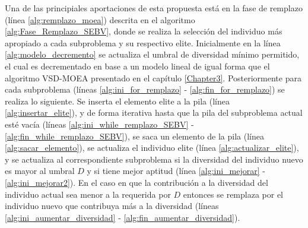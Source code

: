 Una de las principiales aportaciones de esta propuesta está en la fase de remplazo (línea \ref{alg:remplazo_moea}) descrita en el algoritmo \ref{alg:Fase_Remplazo_SEBV}, donde se realiza la selección del individuo más apropiado a cada subproblema y su respectivo elite.
%
Inicialmente en la línea \ref{alg:modelo_decremento} se actualiza el umbral de diversidad mínimo permitido, el cual es decrementado en base a un modelo lineal de igual forma que el algoritmo VSD-MOEA presentado en el capítulo \ref{Chapter3}.
%
Posteriormente para cada subproblema (líneas \ref{alg:ini_for_remplazo} - \ref{alg:fin_for_remplazo}) se realiza lo siguiente.
%
Se inserta el elemento elite a la pila (línea \ref{alg:insertar_elite}), y de forma iterativa hasta que la pila del subproblema actual esté vacía (líneas \ref{alg:ini_while_remplazo_SEBV} - \ref{alg:fin_while_remplazo_SEBV}), se saca un elemento de la pila (línea \ref{alg:sacar_elemento}), se actualiza el individuo elite (línea \ref{alg:actualizar_elite}), y se actualiza al correspondiente subproblema si la diversidad del individuo nuevo es mayor al umbral $D$ y si tiene mejor aptitud (línea \ref{alg:ini_mejorar} - \ref{alg:ini_mejorar2}).
%
En el caso en que la contribución a la diversidad del individuo actual sea menor a la requerida por $D$ entonces se remplaza por el individuo nuevo que contribuya más a la diversidad (líneas \ref{alg:ini_aumentar_diversidad} - \ref{alg:fin_aumentar_diversidad}).
%


